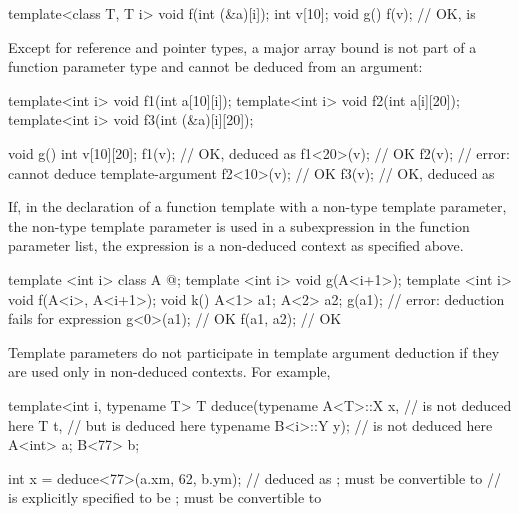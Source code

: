 \pnum
\begin{example}
\begin{codeblock}
template<class T, T i> void f(int (&a)[i]);
int v[10];
void g() {
  f(v);                         // OK,  is 
}
\end{codeblock}
\end{example}

\pnum
\begin{note}
Except for reference and pointer types, a major array bound is not part of a
function parameter type and cannot be deduced from an argument:
\begin{codeblock}
template<int i> void f1(int a[10][i]);
template<int i> void f2(int a[i][20]);
template<int i> void f3(int (&a)[i][20]);

void g() {
  int v[10][20];
  f1(v);                        // OK,  deduced as 
  f1<20>(v);                    // OK
  f2(v);                        // error: cannot deduce template-argument 
  f2<10>(v);                    // OK
  f3(v);                        // OK,  deduced as 
}
\end{codeblock}
\end{note}

\pnum
\begin{note}
If, in the declaration of a function template with a non-type
template parameter, the non-type template parameter
is used in a subexpression in the function parameter list,
the expression is a non-deduced context as specified above.
\begin{example}
\begin{codeblock}
template <int i> class A { @\commentellip@ };
template <int i> void g(A<i+1>);
template <int i> void f(A<i>, A<i+1>);
void k() {
  A<1> a1;
  A<2> a2;
  g(a1);                        // error: deduction fails for expression 
  g<0>(a1);                     // OK
  f(a1, a2);                    // OK
}
\end{codeblock}
\end{example}
\end{note}

\pnum
\begin{note}
Template parameters do not participate in template argument deduction if
they are used only in non-deduced contexts.
For example,

\begin{codeblock}
template<int i, typename T>
T deduce(typename A<T>::X x,    //  is not deduced here
         T t,                   // but  is deduced here
         typename B<i>::Y y);   //  is not deduced here
A<int> a;
B<77>  b;

int    x = deduce<77>(a.xm, 62, b.ym);
//  deduced as ;  must be convertible to 
//  is explicitly specified to be ;  must be convertible to 
\end{codeblock}
\end{note}

